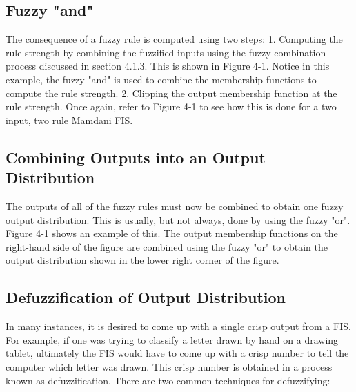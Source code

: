 \subsection{Fuzzy "and"}

The consequence of a fuzzy rule is computed using two steps: 1. Computing the
rule strength by combining the fuzzified inputs using the fuzzy combination
process discussed in section 4.1.3. This is shown in Figure 4-1. Notice in this
example, the fuzzy "and" is used to combine the membership functions to compute
the rule strength. 2. Clipping the output membership function at the rule
strength. Once again, refer to Figure 4-1 to see how this is done for a two
input, two rule Mamdani FIS.

\subsection{Combining Outputs into an Output Distribution} 
The outputs of all of
the fuzzy rules must now be combined to obtain one fuzzy output distribution.
This is usually, but not always, done by using the fuzzy "or". Figure 4-1 shows
an example of this. The output membership functions on the right-hand side of
the figure are combined using the fuzzy "or" to obtain the output distribution
shown in the lower right corner of the figure.

\subsection{Defuzzification of Output Distribution} 

In many instances, it is desired to come up with a single crisp output from a
FIS. For example, if one was trying to classify a letter drawn by hand on a
drawing tablet, ultimately the FIS would have to come up with a crisp number to
tell the computer which letter was drawn. This crisp number is obtained in a
process known as defuzzification. There are two common techniques for
defuzzifying:

